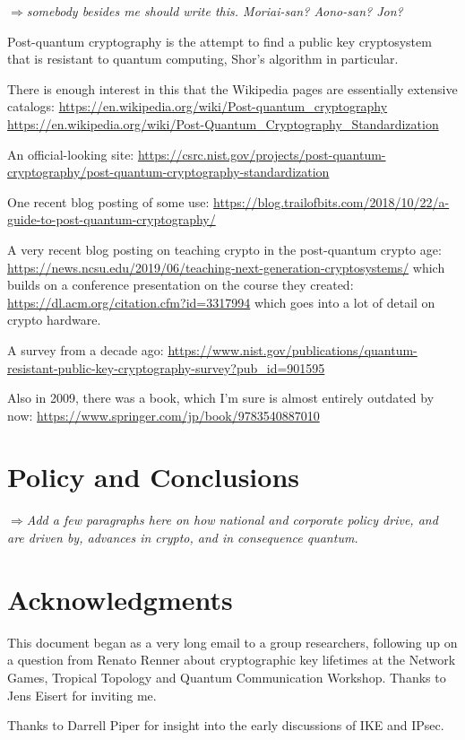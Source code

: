 \documentclass[%
 aip,
 jmp,%
 amsmath,amssymb,
 reprint,%
]{revtex4-1}
\def\comment#1{{\color{ForestGreen}$\Rightarrow${\small\em #1}}}
\begin{document}
\comment{somebody besides me should write this.  Moriai-san?  Aono-san?  Jon?}

Post-quantum cryptography is the attempt to find a public key
cryptosystem that is resistant to quantum computing, Shor's algorithm
in particular.

There is enough interest in this that the Wikipedia pages are
essentially extensive catalogs:
\url{https://en.wikipedia.org/wiki/Post-quantum_cryptography}
\url{https://en.wikipedia.org/wiki/Post-Quantum_Cryptography_Standardization}

An official-looking site:
\url{https://csrc.nist.gov/projects/post-quantum-cryptography/post-quantum-cryptography-standardization}

One recent blog posting of some use:
\url{https://blog.trailofbits.com/2018/10/22/a-guide-to-post-quantum-cryptography/}

A very recent blog posting on teaching crypto in the post-quantum
crypto age:
\url{https://news.ncsu.edu/2019/06/teaching-next-generation-cryptosystems/}
which builds on a conference presentation on the course they created:
\url{https://dl.acm.org/citation.cfm?id=3317994}
which goes into a lot of detail on crypto hardware.

A survey from a decade ago:
\url{https://www.nist.gov/publications/quantum-resistant-public-key-cryptography-survey?pub_id=901595}

Also in 2009, there was a book, which I'm sure is almost entirely
outdated by now:
\url{https://www.springer.com/jp/book/9783540887010}

\section{Policy and Conclusions}

\comment{Add a few paragraphs here on how national and corporate
  policy drive, and are driven by, advances in crypto, and in
  consequence quantum.}

\section*{Acknowledgments}

This document began as a very long email to a group researchers,
following up on a question from Renato Renner about cryptographic key
lifetimes at the Network Games, Tropical Topology and Quantum
Communication Workshop.  Thanks to Jens Eisert for inviting me.

Thanks to Darrell Piper for insight into the early discussions of IKE
and IPsec.
\end{document}
